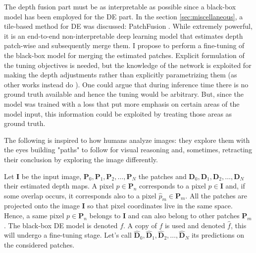 The depth fusion part must be as interpretable as possible since a black-box model has been employed for the DE part.
In the section \ref{sec:miscellaneous}, a tile-based method for DE was discussed: PatchFusion \cite{PatchFusion}.
While extremely powerful, it is an end-to-end non-interpretable deep learning model that estimates depth patch-wise and subsequently merge them.
I propose to perform a fine-tuning of the black-box model for merging the estimated patches.
Explicit formulation of the tuning objectives is needed, but the knowledge of the network is exploited for making the depth adjustments rather than explicitly parametrizing them (as other works instead do \cite{konrad2, DepthTransfer, 360MonoDepth}).
One could argue that during inference time there is no ground truth available and hence the tuning would be arbitrary.
But, since the model was trained with a loss that put more emphasis on certain areas of the model input, this information could be exploited by treating those areas as ground truth.

The following is inspired to how humans analyze images: they explore them with the eyes building "paths" to follow for visual reasoning and, sometimes, retracting their conclusion by exploring the image differently.

\vfill

Let $\mathbf{I}$ be the input image, $\mathbf{P}_{0}, \mathbf{P}_{1}, \mathbf{P}_{2}, \dotsc, \mathbf{P}_{N}$ the patches and $\mathbf{D}_{0}, \mathbf{D}_{1}, \mathbf{D}_{2}, \dotsc, \mathbf{D}_{N}$ their estimated depth maps.
A pixel $p \in \mathbf{P}_{n}$ corresponds to a pixel $\hat{p} \in \mathbf{I}$ and, if some overlap occurs, it corresponds also to a pixel $\hat{p}_{m} \in \mathbf{P}_{m}$.
All the patches are projected onto the image $\mathbf{I}$ so that pixel coordinates live in the same space.
Hence, a same pixel $p \in \mathbf{P}_{n}$ belongs to $\mathbf{I}$ and can also belong to other patches $\mathbf{P}_{m}$.
The black-box DE model is denoted $f$.
A copy of $f$ is used and denoted $\hat{f}$, this will undergo a fine-tuning stage.
Let's call $\hat{\mathbf{D}}_{0}, \hat{\mathbf{D}}_{1}, \hat{\mathbf{D}}_{2}, \dotsc, \hat{\mathbf{D}}_{N}$ its predictions on the considered patches.

